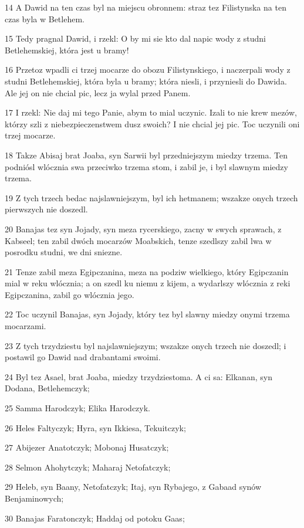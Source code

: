 \par 14 A Dawid na ten czas byl na miejscu obronnem: straz tez Filistynska na ten czas byla w Betlehem.
\par 15 Tedy pragnal Dawid, i rzekl: O by mi sie kto dal napic wody z studni Betlehemskiej, która jest u bramy!
\par 16 Przetoz wpadli ci trzej mocarze do obozu Filistynskiego, i naczerpali wody z studni Betlehemskiej, która byla u bramy; która niesli, i przyniesli do Dawida. Ale jej on nie chcial pic, lecz ja wylal przed Panem.
\par 17 I rzekl: Nie daj mi tego Panie, abym to mial uczynic. Izali to nie krew mezów, którzy szli z niebezpieczenstwem dusz swoich? I nie chcial jej pic. Toc uczynili oni trzej mocarze.
\par 18 Takze Abisaj brat Joaba, syn Sarwii byl przedniejszym miedzy trzema. Ten podniósl wlócznia swa przeciwko trzema stom, i zabil je, i byl slawnym miedzy trzema.
\par 19 Z tych trzech bedac najslawniejszym, byl ich hetmanem; wszakze onych trzech pierwszych nie doszedl.
\par 20 Banajas tez syn Jojady, syn meza rycerskiego, zacny w swych sprawach, z Kabseel; ten zabil dwóch mocarzów Moabskich, tenze szedlszy zabil lwa w posrodku studni, we dni sniezne.
\par 21 Tenze zabil meza Egipczanina, meza na podziw wielkiego, który Egipczanin mial w reku wlócznia; a on szedl ku niemu z kijem, a wydarlszy wlócznia z reki Egipczanina, zabil go wlócznia jego.
\par 22 Toc uczynil Banajas, syn Jojady, który tez byl slawny miedzy onymi trzema mocarzami.
\par 23 Z tych trzydziestu byl najslawniejszym; wszakze onych trzech nie doszedl; i postawil go Dawid nad drabantami swoimi.
\par 24 Byl tez Asael, brat Joaba, miedzy trzydziestoma. A ci sa: Elkanan, syn Dodana, Betlehemczyk;
\par 25 Samma Harodczyk; Elika Harodczyk.
\par 26 Heles Faltyczyk; Hyra, syn Ikkiesa, Tekuitczyk;
\par 27 Abijezer Anatotczyk; Mobonaj Husatczyk;
\par 28 Selmon Ahohytczyk; Maharaj Netofatczyk;
\par 29 Heleb, syn Baany, Netofatczyk; Itaj, syn Rybajego, z Gabaad synów Benjaminowych;
\par 30 Banajas Faratonczyk; Haddaj od potoku Gaas;
